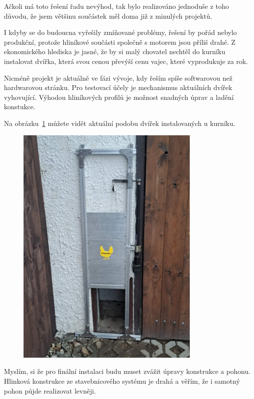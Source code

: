 Ačkoli má toto řešení řadu nevýhod, tak bylo realizováno jednoduše z toho důvodu, že jsem většinu součástek měl doma již z minulých projektů.

I kdyby se do budoucna vyřešily zmíňované problémy, řešení by pořád nebylo produkční, protože hliníkové součásti společně s motorem jsou příliš drahé.
Z ekonomického hlediska je jasné, že by si malý chovatel nechtěl do kurníku instalovat dvířka, která svou cenou převýší cenu vajec, které vyprodukuje za rok.

Nicméně projekt je aktuálně ve fázi vývoje, kdy řeším spíše softwarovou než hardwarovou stránku.
Pro testovací účely je mechanismus aktuálních dvířek vyhovující.
Výhodou hliníkových profilů je možnost snadných úprav a ladění konstukce.

Na obrázku~\ref{fig:proto_dvirka} můžete vidět aktuální podobu dvířek instalovaných u kurníku.

\begin{figure}[H]
    \centering
    \includegraphics[width=0.8\textwidth]{img/proto_dvirka}
    \label{fig:proto_dvirka}
\end{figure}

Myslím, si že pro finální instalaci budu muset zvážit úpravy konstrukce a pohonu.
Hlinková konstrukce ze stavebnicového systému je drahá a věřím, že i samotný pohon půjde realizovat levněji.




